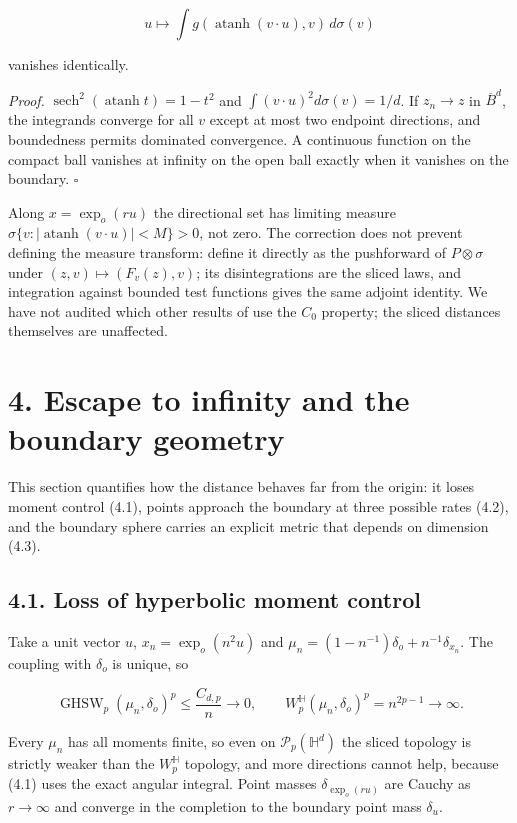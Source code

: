 \documentclass[
  british,
  11pt,
  a4paper,
]{article}
\begin{document}
\[
u\longmapsto\int g(\operatorname{atanh}(v\cdot u),v)\,d\sigma(v)
\tag{3.2}
\]

vanishes identically.

\emph{Proof.} \(\operatorname{sech}^2(\operatorname{atanh}t)=1-t^2\) and
\(\int(v\cdot u)^2d\sigma(v)=1/d\). If \(z_n\to z\) in
\(\overline B^d\), the integrands converge for all \(v\) except at most
two endpoint directions, and boundedness permits dominated convergence.
A continuous function on the compact ball vanishes at infinity on the
open ball exactly when it vanishes on the boundary. \(\square\)

Along \(x=\exp_o(ru)\) the directional set has limiting measure
\(\sigma\{v:|\operatorname{atanh}(v\cdot u)|<M\}>0\), not zero. The
correction does not prevent defining the measure transform: define it
directly as the pushforward of \(P\otimes\sigma\) under
\((z,v)\mapsto(F_v(z),v)\); its disintegrations are the sliced laws, and
integration against bounded test functions gives the same adjoint
identity. We have not audited which other results of \citet{BDC2025} use
the \(C_0\) property; the sliced distances themselves are unaffected.

\section{4. Escape to infinity and the boundary
geometry}\label{escape-to-infinity-and-the-boundary-geometry}

This section quantifies how the distance behaves far from the origin: it
loses moment control (4.1), points approach the boundary at three
possible rates (4.2), and the boundary sphere carries an explicit metric
that depends on dimension (4.3).

\subsection{4.1. Loss of hyperbolic moment
control}\label{loss-of-hyperbolic-moment-control}

Take a unit vector \(u\), \(x_n=\exp_o(n^2u)\) and
\(\mu_n=(1-n^{-1})\delta_o+n^{-1}\delta_{x_n}\). The coupling with
\(\delta_o\) is unique, so

\[
\operatorname{GHSW}_p(\mu_n,\delta_o)^p\leq\frac{C_{d,p}}n\longrightarrow0,
\qquad
W_p^{\mathbb H}(\mu_n,\delta_o)^p=n^{2p-1}\longrightarrow\infty.
\tag{4.1}
\]

Every \(\mu_n\) has all moments finite, so even on
\(\mathcal P_p(\mathbb H^d)\) the sliced topology is strictly weaker
than the \(W_p^{\mathbb H}\) topology, and more directions cannot help,
because (4.1) uses the exact angular integral. Point masses
\(\delta_{\exp_o(ru)}\) are Cauchy as \(r\to\infty\) and converge in the
completion to the boundary point mass \(\delta_u\).
\end{document}
